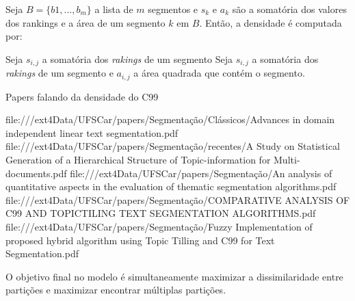 Seja $B = \{b1,...,b_m\}$ a lista de $m$ segmentos e $s_k$ e $a_k$ são a somatória dos valores dos rankings e a área de um segmento $k$ em $B$. Então, a densidade é computada por: 



Seja $s_{i,j}$ a somatória dos \textit{rakings} de um segmento 
Seja $s_{i,j}$ a somatória dos \textit{rakings} de um segmento e $a_{i,j}$ a área quadrada que contém o segmento. 





Papers falando da densidade do C99

file:///ext4Data/UFSCar/papers/Segmentação/Clássicos/Advances in domain independent linear text segmentation.pdf
file:///ext4Data/UFSCar/papers/Segmentação/recentes/A Study on Statistical Generation of a Hierarchical Structure of Topic-information for Multi-documents.pdf
file:///ext4Data/UFSCar/papers/Segmentação/An analysis of quantitative aspects in the evaluation of thematic segmentation algorithms.pdf
file:///ext4Data/UFSCar/papers/Segmentação/COMPARATIVE ANALYSIS OF C99 AND TOPICTILING TEXT SEGMENTATION ALGORITHMS.pdf
file:///ext4Data/UFSCar/papers/Segmentação/Fuzzy Implementation of proposed hybrid algorithm using Topic Tilling and C99 for Text Segmentation.pdf
































O objetivo final no modelo é simultaneamente maximizar a dissimilaridade entre partições e maximizar
encontrar múltiplas partições. 






